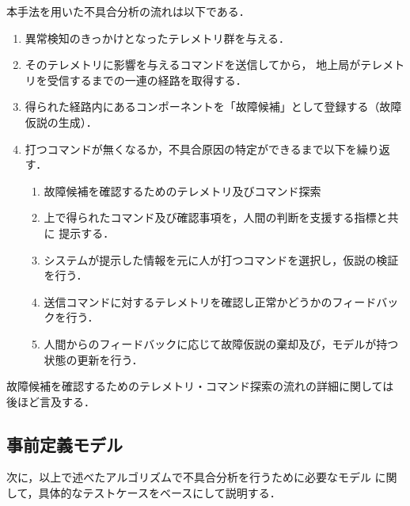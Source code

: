 \documentclass[11pt]{article}
\begin{document}
本手法を用いた不具合分析の流れは以下である．
\begin{enumerate}[1]
   \item 異常検知のきっかけとなったテレメトリ群を与える．
   \item そのテレメトリに影響を与えるコマンドを送信してから，
   地上局がテレメトリを受信するまでの一連の経路を取得する．
   \item 得られた経路内にあるコンポーネントを「故障候補」として登録する（故障仮説の生成）．
   \item 打つコマンドが無くなるか，不具合原因の特定ができるまで以下を繰り返す．
   \begin{enumerate}[\textrm{4.}1]
      \item 故障候補を確認するためのテレメトリ及びコマンド探索
      \item 上で得られたコマンド及び確認事項を，人間の判断を支援する指標と共に
      提示する．
      \item システムが提示した情報を元に人が打つコマンドを選択し，仮説の検証を行う．
      \item 送信コマンドに対するテレメトリを確認し正常かどうかのフィードバックを行う．
      \item 人間からのフィードバックに応じて故障仮説の棄却及び，モデルが持つ状態の更新を行う．
   \end{enumerate}
\end{enumerate}
故障候補を確認するためのテレメトリ・コマンド探索の流れの詳細に関しては
後ほど言及する．



\subsection{事前定義モデル}
次に，以上で述べたアルゴリズムで不具合分析を行うために必要なモデル
に関して，具体的なテストケースをベースにして説明する．%
\end{document}
